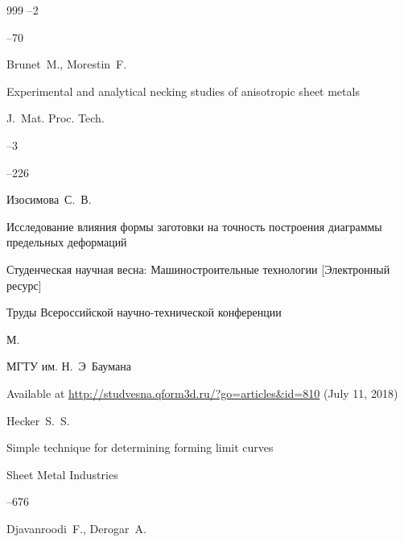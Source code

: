 \begin{thebibliography}{999}
--2

--70






\by Brunet~M., Morestin~F. 

\paper Experimental and analytical necking studies of anisotropic sheet metals

\jour J.~Mat. Proc. Tech.



--3

--226






\by Изосимова~С.~В. 

\paper Исследование влияния формы заготовки на точность построения диаграммы предельных деформаций 

\inbook Студенческая научная весна: Машиностроительные технологии \rm [Электронный ресурс]

\bookinfo Труды Всероссийской научно-технической конференции 

\publaddr М.

\publ МГТУ им. Н.~Э~Баумана

\elink Available at \url{http://studvesna.qform3d.ru/?go=articles&id=810} (July 11, 2018)










\by Hecker~S.~S. 

\paper Simple technique for determining forming limit curves

\jour  Sheet Metal Industries




–676




\by Djavanroodi~F., Derogar~A.  


\end{thebibliography}
